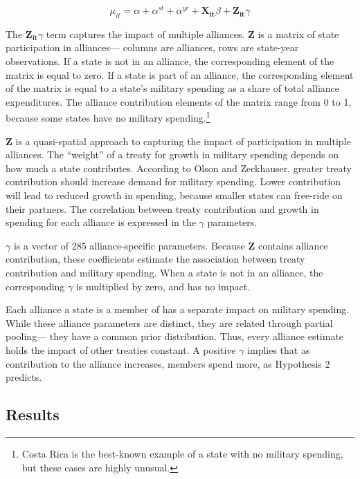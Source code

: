 \documentclass[12pt]{article}
\begin{document}
\begin{equation}
\mu_{it} = \alpha + \alpha^{st} + \alpha^{yr} + \mathbf{X_{it}} \beta + \mathbf{Z_{it}} \gamma 
\end{equation}


The $\mathbf{Z_{it}} \gamma$ term captures the impact of multiple alliances. 
\textbf{Z} is a matrix of state participation in alliances--- columns are alliances, rows are state-year observations. 
If a state is not in an alliance, the corresponding element of the matrix is equal to zero. 
If a state is part of an alliance, the corresponding element of the matrix is equal to a state's military spending as a share of total alliance expenditures. 
The alliance contribution elements of the matrix range from 0 to 1, because some states have no military spending.\footnote{Costa Rica is the best-known example of a state with no military spending, but these cases are highly unusual.} 


\textbf{Z} is a quasi-spatial approach to capturing the impact of participation in multiple alliances.
The ``weight'' of a treaty for growth in military spending depends on how much a state contributes.  
According to Olson and Zeckhauser, greater treaty contribution should increase demand for military spending. 
Lower contribution will lead to reduced growth in spending, because smaller states can free-ride on their partners.
The correlation between treaty contribution and growth in spending for each alliance is expressed in the $\gamma$ parameters. 


$\gamma$ is a vector of 285 alliance-specific parameters.  
Because \textbf{Z} contains alliance contribution, these coefficients estimate the association between treaty contribution and military spending. 
When a state is not in an alliance, the corresponding $\gamma$ is multiplied by zero, and has no impact. 


Each alliance a state is a member of has a separate impact on military spending.
While these alliance parameters are distinct, they are related through partial pooling--- they have a common prior distribution. 
Thus, every alliance estimate holds the impact of other treaties constant. 
A positive $\gamma$ implies that as contribution to the alliance increases, members spend more, as Hypothesis 2 predicts. 
    


\subsection{Results} 
\end{document}
